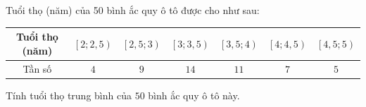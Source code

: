 \begin{bt}%
Tuổi thọ (năm) của 50 bình ắc quy ô tô được cho như sau:
\begin{center}
\begin{tabular}{|c|c|c|c|c|c|c|}
\hline
Tuổi thọ (năm)& $\left[2;2{,}5 \right)$ & $\left[2{,}5;3 \right)$ & $\left[3;3{,}5 \right)$&$\left[3{,}5;4 \right)$&$\left[4;4{,}5 \right)$&$\left[4{,}5;5 \right)$ \\
\hline
Tần số &$4$& $9$ & $14$ &$11$ & $7$&$5$ \\
\hline
\end{tabular}
\end{center}
Tính tuổi thọ trung bình của $50$ bình ắc quy ô tô này.
\end{bt}


